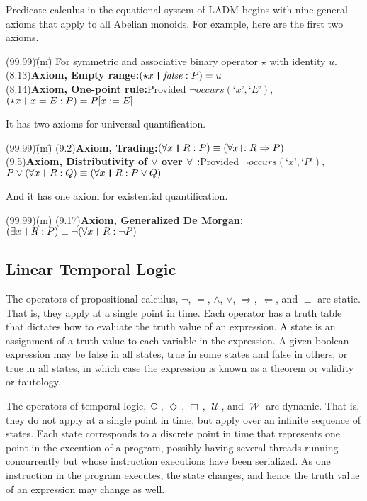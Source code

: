 \documentclass[12pt, fleqn, leqno]{article}
\newcommand{\lgap}{2pt}                             %
\newcommand{\impl}{\ensuremath{\Rightarrow}}        %
\newcommand{\foll}{\ensuremath{\Leftarrow}}         %
\newcommand{\Until}{\;\mathcal{U}\;}
\newcommand{\Wait}{\;\mathcal{W}\;}
\newcommand{\Next}{\;\,\text{\raisebox{3.5pt}{\circle{6}}}}
\newcommand{\Event}{\Diamond\,}
\newcommand{\Always}{\Box\,}
\newcommand{\thedr}{\rule[-.25ex]{.32mm}{1.75ex}}   %
\newcommand{\dr}{\;\,\thedr\,\;}                    %
\newcommand{\rb}{:}                                 %
\newcommand{\drrb}{\;\thedr\,{:}\;}                 %
\newcommand{\all}{\forall}                          %
\newcommand{\ext}{\exists}                          %
\newcommand{\Lq}{\mbox{`}}
\newcommand{\Rq}{\mbox{'}}
\begin{document}
Predicate calculus in the equational system of LADM begins with nine general axioms that apply to all Abelian monoids.
For example, here are the first two axioms.
\begin{tabbing}
(99.99)\;\=(m)\;\=\kill
For symmetric and associative binary operator $\star$ with identity $u$.\\[\lgap]
(8.13)\>\textbf{Axiom, Empty range:}\quad $(\star x \dr \mathit{false} \rb P) =u$\\[\lgap]
(8.14)\>\textbf{Axiom, One-point rule:}\quad Provided $\neg occurs(\Lq x\Rq ,\Lq E\Rq)$,\\[\lgap]
      \>$(\star x\dr x=E\rb P) = P[x:=E]$
\end{tabbing}
It has two axioms for universal quantification.
\begin{tabbing}
(99.99)\;\=(m)\;\=\kill
(9.2)\>\textbf{Axiom, Trading:}\quad $(\all x\dr R\rb P)\equiv (\all x\drrb R\impl P)$\\[\lgap]
(9.5)\>\textbf{Axiom, Distributivity of $\lor$ over $\all$ :}\quad Provided $\neg occurs(\Lq x\Rq ,\Lq P\Rq)$,\\[\lgap]
      \>$P\lor (\all x\dr R\rb Q)\equiv (\all x\dr R\rb P\lor Q)$
\end{tabbing}
And it has one axiom for existential quantification.
\begin{tabbing}
(99.99)\;\=(m)\;\=\kill
(9.17)\>\textbf{Axiom, Generalized De Morgan:}\quad $(\ext x\dr R\rb P)\equiv \neg (\all x\dr R\rb \neg P)$
\end{tabbing}

\subsection{Linear Temporal Logic}

The operators of propositional calculus, $\neg$, $=$, $\land$, $\lor$, $\impl$, $\foll$, and $\equiv$ are static.
That is, they apply at a single point in time.
Each operator has a truth table that dictates how to evaluate the truth value of an expression.
A state is an assignment of a truth value to each variable in the expression.
A given boolean expression may be false in all states, true in some states and false in others, or true in all states, in which case the expression is known as a theorem or validity or tautology.

The operators of temporal logic, $\Next$, $\Event$, $\Always$, $\Until$, and $\Wait$ are dynamic.
That is, they do not apply at a single point in time, but apply over an infinite sequence of states.
Each state corresponds to a discrete point in time that represents one point in the execution of a program,
possibly having several threads running concurrently but whose instruction executions have been serialized.
As one instruction in the program executes, the state changes, and hence the truth value of an expression may change as well.
\end{document}
